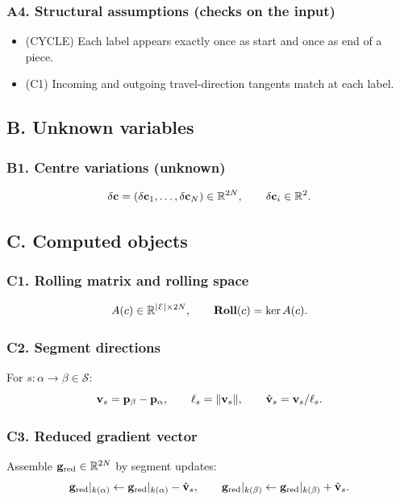 \documentclass[12pt,letterpaper]{amsart}
\theoremstyle{definition}
\theoremstyle{remark}
\newcommand{\Roll}{\text{\rm \bf Roll}}
\newcommand{\R}{{\mathbb{R}}}
\begin{document}
\subsubsection*{A4. Structural assumptions (checks on the input)}
\begin{itemize}
\item (CYCLE) Each label appears exactly once as start and once as end of a piece.
\item (C1) Incoming and outgoing travel-direction tangents match at each label.
\end{itemize}

\subsection{B. Unknown variables}

\subsubsection*{B1. Centre variations (unknown)}
\[
\delta{\bf c}=(\delta{\bf c}_1,\dots,\delta{\bf c}_N)\in\R^{2N},
\qquad
\delta{\bf c}_i\in\R^2.
\]

\subsection{C. Computed objects}

\subsubsection*{C1. Rolling matrix and rolling space}
\[
A(c)\in\R^{|\mathcal E|\times 2N},
\qquad
\Roll(c)=\ker A(c).
\]

\subsubsection*{C2. Segment directions}
For $s:\alpha\to\beta\in\mathcal S$:
\[
{\bf v}_s={\bf p}_\beta-{\bf p}_\alpha,\qquad \ell_s=\|{\bf v}_s\|,\qquad \hat{\bf v}_s={\bf v}_s/\ell_s.
\]

\subsubsection*{C3. Reduced gradient vector}
Assemble ${\bf g}_{\rm red}\in\R^{2N}$ by segment updates:
\[
{\bf g}_{\rm red}|_{k(\alpha)}\gets {\bf g}_{\rm red}|_{k(\alpha)}-\hat{\bf v}_s,
\qquad
{\bf g}_{\rm red}|_{k(\beta)}\gets {\bf g}_{\rm red}|_{k(\beta)}+\hat{\bf v}_s.
\]
\end{document}
